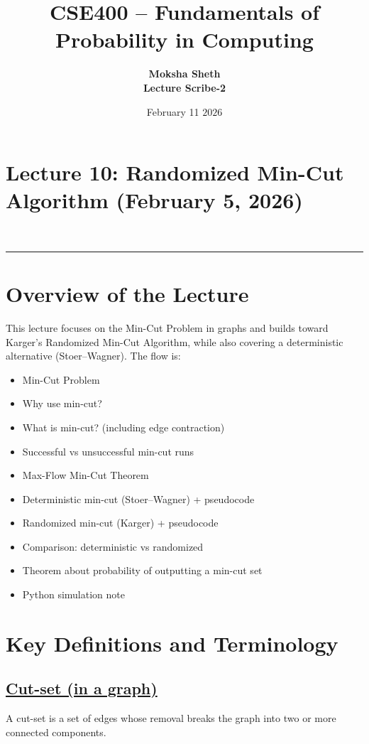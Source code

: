 \documentclass[11pt]{article}
\title{\textbf{CSE400 – Fundamentals of Probability in Computing}}
\author{\textbf{Moksha Sheth} \\\textbf{Lecture Scribe-2}}
\date{February 11 $2026$}
\begin{document}
\maketitle

\section*{Lecture 10: Randomized Min-Cut Algorithm (February 5, 2026)}\\

\hrule
\vspace{1.5cm}

\section{Overview of the Lecture}
This lecture focuses on the Min-Cut Problem in graphs and builds toward Karger’s Randomized Min-Cut Algorithm, while also covering a deterministic alternative (Stoer--Wagner). The flow is:
\begin{itemize}
\item Min-Cut Problem
\item Why use min-cut?
\item What is min-cut? (including edge contraction)
\item Successful vs unsuccessful min-cut runs
\item Max-Flow Min-Cut Theorem
\item Deterministic min-cut (Stoer--Wagner) + pseudocode
\item Randomized min-cut (Karger) + pseudocode
\item Comparison: deterministic vs randomized
\item Theorem about probability of outputting a min-cut set
\item Python simulation note
\end{itemize}

\vspace{1cm}
\section{Key Definitions and Terminology}

\subsection*{\underline{Cut-set (in a graph)}}
A cut-set is a set of edges whose removal breaks the graph into two or more connected components.
\end{document}
